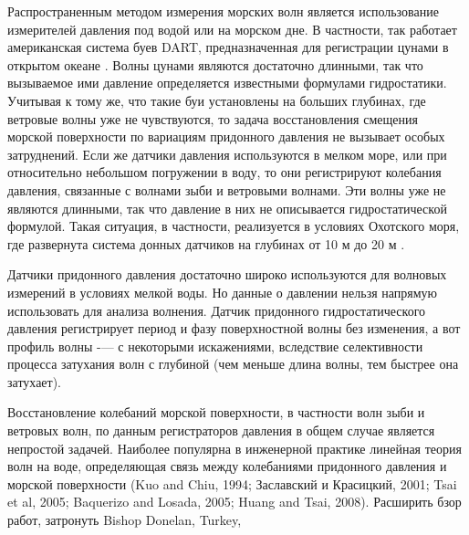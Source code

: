 Распространенным методом измерения морских волн является использование измерителей давления под водой или на морском дне. В частности, так работает американская система буев DART, предназначенная для регистрации цунами в открытом океане \cite{dart_Bernard}. Волны цунами являются достаточно длинными, так что вызываемое ими давление определяется известными формулами гидростатики. Учитывая к тому же, что такие буи установлены на больших глубинах, где ветровые волны уже не чувствуются, то задача восстановления смещения морской поверхности по вариациям придонного давления не вызывает особых затруднений. Если же датчики давления используются в мелком море, или при относительно небольшом погружении в воду, то они регистрируют колебания давления, связанные с волнами зыби и ветровыми волнами. Эти волны уже не являются длинными, так что давление в них не описывается гидростатической формулой. Такая ситуация, в частности, реализуется в условиях Охотского моря, где развернута система донных датчиков на глубинах от 10 м до 20 м \cite{Zaits_Kuz_NGTU_2013, firstResultsSakh_2009}.

Датчики придонного давления достаточно широко используются для волновых измерений в условиях мелкой воды. Но данные о давлении нельзя напрямую использовать для анализа волнения. Датчик придонного гидростатического давления регистрирует период и фазу поверхностной волны без изменения, а вот профиль волны -— с некоторыми искажениями, вследствие селективности процесса затухания волн с глубиной (чем меньше длина волны, тем быстрее она затухает).

Восстановление колебаний морской поверхности, в частности волн зыби и ветровых волн, по данным регистраторов давления в общем случае является непростой задачей. Наиболее популярна в инженерной практике линейная теория волн на воде, определяющая связь между колебаниями придонного давления и морской поверхности (Kuo and Chiu, 1994; Заславский и Красицкий, 2001; Tsai et al, 2005; Baquerizo and Losada, 2005; Huang and Tsai, 2008).
\textcolor[rgb]{1.00,0.00,0.00}{
Расширить бзор работ, затронуть Bishop Donelan, Turkey, \cite{Huang_press}}


